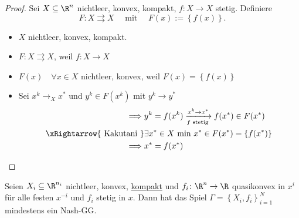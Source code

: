 \begin{proof}
	Sei $X\subseteq  \R^{n}$ nichtleer, konvex, kompakt, $f \colon X \rightarrow X $ stetig. Definiere
	\[
		F \colon X \rightrightarrows X \quad\text{ mit }\quad F(x) := \left\{ f(x) \right\} 
	.\] 
	\begin{itemize}
		\item $X$ nichtleer, konvex, kompakt.
		\item $F \colon X \rightrightarrows X $, weil $f \colon X \rightarrow X $
		\item $F(x) \quad \forall x \in X$ nichtleer, konvex, weil $F(x) = \left\{ f(x) \right\} $
		\item Sei $x^{k}\rightarrow_{X}{x}^{*}$ und $y^{k} \in F(x^{k})$ mit $y^{k} \rightarrow {y}^{*}$
				\begin{align*}
					\implies& y^{k}= f(x^{k}) \underset{f \text{ stetig }}{\xrightarrow{x^{k} \rightarrow x^{*}}} f({x}^{*}) \in F({x}^{*}) \\
					\xRightarrow{\text{ Kakutani }}& \exists {x}^{*} \in X \text{ min } {x}^{*} \in F({x}^{*}) = \left\{ f({x}^{*}) \right\} \\
					\implies& {x}^{*} = f({x}^{*})
				\end{align*}
	\end{itemize}
\end{proof}

\begin{satz}
	Seien $X_{i} \subseteq \R^{n_{i}}$ nichtleer, konvex, \underline{kompakt} und $f_{i} \colon \R^{n} \rightarrow \R $ quasikonvex in $x^{i}$ für alle festen $x^{-i}$ und $f_{i}$ stetig in $x$. Dann hat das Spiel $\Gamma = \left\{ X_{i}, f_{i} \right\} _{i=1}^{N}$ mindestens ein Nash-GG.
\end{satz}

